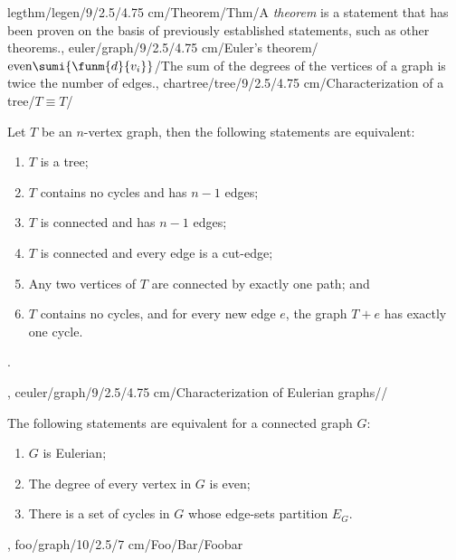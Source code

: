 legthm/legen/9/2.5/4.75 cm/Theorem/Thm/{A \emph{theorem} is a statement that has been proven on the basis of previously established statements, such as other theorems.},
euler/graph/9/2.5/4.75 cm/{Euler's theorem}/$\mbox{even}\sumi{\funm{d}{v_i}}$/{The sum of the degrees of the vertices of a graph is twice the number of edges.},
chartree/tree/9/2.5/4.75 cm/{Characterization of a tree}/{$T\equiv T$}/{Let $T$ be an $n$-vertex graph, then the following statements are equivalent:\begin{enumerate}\item $T$ is a tree; \item $T$ contains no cycles and has $n-1$ edges; \item $T$ is connected and has $n-1$ edges; \item $T$ is connected and every edge is a cut-edge; \item Any two vertices of $T$ are connected by exactly one path; and \item $T$ contains no cycles, and for every new edge $e$, the graph $T+e$ has exactly one cycle.\end{enumerate}.},
ceuler/graph/9/2.5/4.75 cm/{Characterization of Eulerian graphs}/{}/{The following statements are equivalent for a connected graph $G$:\begin{enumerate}\item $G$ is Eulerian; \item The degree of every vertex in $G$ is even; \item There is a set of cycles in $G$ whose edge-sets partition $E_G$.\end{enumerate}},
foo/graph/10/2.5/7 cm/{Foo}/{Bar}/{Foobar}